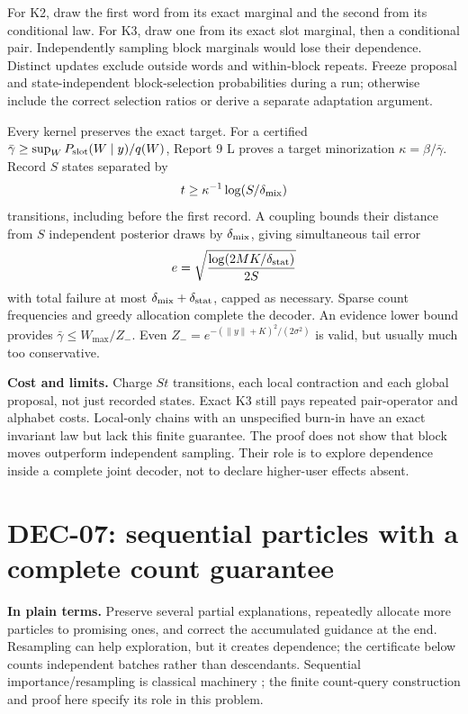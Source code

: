 \documentclass[10pt,a4paper]{article}
\begin{document}
For K2, draw the first word from its exact marginal and the second from its conditional law.
For K3, draw one from its exact slot marginal, then a conditional pair. Independently sampling block
marginals would lose their dependence. Distinct updates exclude outside words and within-block repeats.
Freeze proposal and state-independent block-selection probabilities during a run; otherwise include the
correct selection ratios or derive a separate adaptation argument.

Every kernel preserves the exact target. For a certified $\bar\gamma\geq\sup_W P_{\rm slot}(W\mid y)/q(W)$,
Report 9 L proves a target minorization $\kappa=\beta/\bar\gamma$.
Record $S$ states separated by
\[
 t\geq\kappa^{-1}\log(S/\delta_{\rm mix})
\]
transitions, including before the first record. A coupling bounds their distance from $S$ independent
posterior draws by $\delta_{\rm mix}$, giving simultaneous tail error
\[
 e=\sqrt{\frac{\log(2MK/\delta_{\rm stat})}{2S}}
\]
with total failure at most $\delta_{\rm mix}+\delta_{\rm stat}$, capped as necessary.
Sparse count frequencies and greedy allocation complete the decoder.
An evidence lower bound provides $\bar\gamma\leq W_{\max}/Z_-$.
Even $Z_-=e^{-(\|y\|+K)^2/(2\sigma^2)}$ is valid, but usually much too conservative.

\textbf{Cost and limits.} Charge $St$ transitions, each local contraction and each global proposal,
not just recorded states. Exact K3 still pays repeated pair-operator and alphabet costs.
Local-only chains with an unspecified burn-in have an exact invariant law but lack this finite guarantee.
The proof does not show that block moves outperform independent sampling.
Their role is to explore dependence inside a complete joint decoder, not to declare higher-user effects absent.

\clearpage
\section{DEC-07: sequential particles with a complete count guarantee}
\label{sec:particles}
\textbf{In plain terms.} Preserve several partial explanations, repeatedly allocate more particles to
promising ones, and correct the accumulated guidance at the end. Resampling can help exploration,
but it creates dependence; the certificate below counts independent batches rather than descendants.
Sequential importance/resampling is classical machinery \cite{delmoral2006}; the finite count-query
construction and proof here specify its role in this problem.
\end{document}
